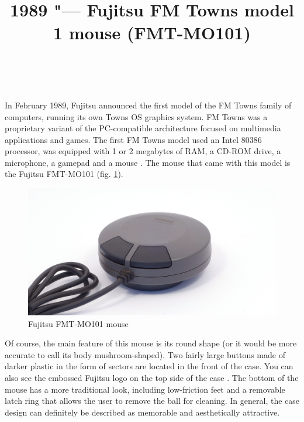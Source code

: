 \documentclass[11pt, a4paper]{article}
\begin{document}
\title{1989 "--- Fujitsu FM Towns model 1 mouse (FMT-MO101)}
\date{}
\author{~}
\maketitle
{}

In February 1989, Fujitsu announced the first model of the FM Towns family of computers, running its own Towns OS graphics system. FM Towns was a proprietary variant of the PC-compatible architecture focused on multimedia applications and games. The first FM Towns model used an Intel 80386 processor, was equipped with 1 or 2 megabytes of RAM, a CD-ROM drive, a microphone, a gamepad and a mouse \cite{wikipedia}. The mouse that came with this model is the Fujitsu FMT-MO101 (fig. \ref{fig:FMT1Pic}).

\begin{figure}[h]
   \centering
    \includegraphics[scale=0.6]{1989_fujitsu_fmt_mo101_mouse/pic_30.jpg}
    \caption{Fujitsu FMT-MO101 mouse}
    \label{fig:FMT1Pic}
\end{figure}

Of course, the main feature of this mouse is its round shape (or it would be more accurate to call its body mushroom-shaped). Two fairly large buttons made of darker plastic in the form of sectors are located in the front of the case. You can also see the embossed Fujitsu logo on the top side of the case \cite{twinklemagic}. The bottom of the mouse has a more traditional look, including low-friction feet and a removable latch ring that allows the user to remove the ball for cleaning. In general, the case design can definitely be described as memorable and aesthetically attractive.
\end{document}
